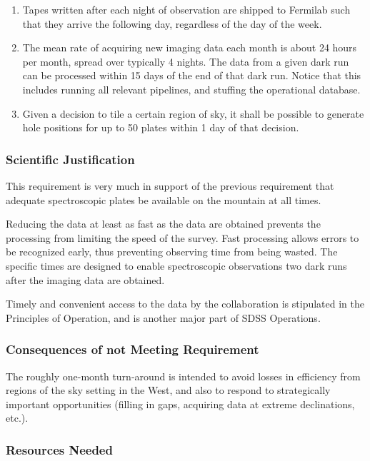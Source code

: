 \begin{enumerate} 
\item Tapes written after each night of observation are shipped to
Fermilab such that they arrive the following day, regardless of the day of
the week. 

\item
The mean rate of acquiring new imaging data each 
month is about 24 hours per month, spread over typically 4 nights.  
The data from a given dark run can be processed within 15 days of 
the end of that dark run.  Notice that this includes running all
relevant pipelines, and stuffing the operational database. 

\item Given a decision to tile a certain region of sky, it shall 
be possible to generate hole positions for up to 50 plates within 
1 day of that decision. 

\end{enumerate}

\subsubsection{Scientific Justification}

This requirement is very much in support of the previous requirement
that adequate spectroscopic plates be available on the mountain at all
times. 

Reducing the data at least as fast as the data are obtained prevents the 
processing from limiting the speed of the survey.  Fast processing allows 
errors to be recognized early, thus preventing observing time from being 
wasted.  The specific times are designed to enable spectroscopic 
observations two dark runs after the imaging data are obtained. 

Timely and convenient access to the data by the collaboration is stipulated 
in the Principles of Operation, and is another major part of SDSS 
Operations.

\subsubsection{Consequences of not Meeting Requirement}

The roughly one-month turn-around is intended to avoid losses in 
efficiency from regions of the sky setting in the West, and also to respond 
to strategically important opportunities (filling in gaps, acquiring data at 
extreme declinations, etc.). 

\subsubsection{Resources Needed}

